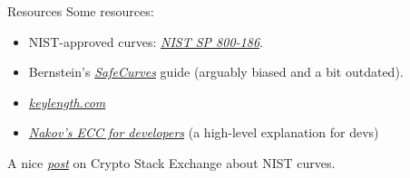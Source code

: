 \begin{frame}{Resources}
  Some resources:
  \begin{itemize}[<+(1)->]
    \item NIST-approved curves: \href{https://csrc.nist.gov/pubs/sp/800/186/final}{\textit{NIST SP 800-186}}.
    \item Bernstein's \href{https://safecurves.cr.yp.to}{\emph{SafeCurves}} guide (arguably biased and a bit outdated).
    \item \href{https://www.keylength.com/en/}{\textit{keylength.com}}
    \item \href{https://cryptobook.nakov.com/asymmetric-key-ciphers/elliptic-curve-cryptography-ecc}{\textit{Nakov's ECC for developers}} (a high-level explanation for devs)
  \end{itemize}

  \pause
  A nice \href{https://crypto.stackexchange.com/questions/93519/why-are-nist-curves-still-used}{\textit{post}} on Crypto Stack Exchange about NIST curves.
\end{frame}


